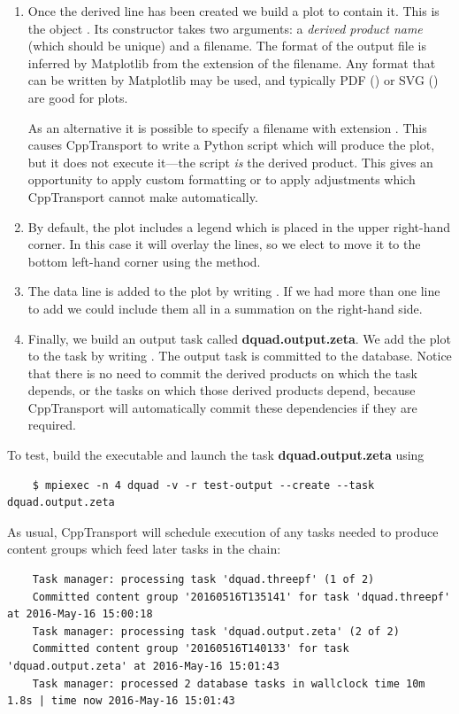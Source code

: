 \documentclass[11pt,a4paper]{article}
\renewcommand{\texttt}[1]{{\ttfamily\fontseries{l}\selectfont{#1}}}
\newcommand{\repoobject}[1]{{\ttfamily\bfseries\small #1}}
\newcommand{\packagefont}{\sffamily}
\newcommand{\CppTransport}{{\packagefont CppTransport}}
\newcommand{\Matplotlib}{{\packagefont Matplotlib}}
\newcommand{\file}[1]{\texttt{{#1}}}
\begin{document}
\begin{enumerate}
	\item Once the derived line has been created we build a plot
	to contain it. This is the object
	\texttt{time_series_plot<>}.
	Its constructor takes two arguments:
	a \emph{derived product name} (which should be unique)
	and a filename.
	The format of the output file is inferred by
	{\Matplotlib} from the extension of the filename.
	Any format that can be written by {\Matplotlib} may be used,
	and typically PDF (\file{.pdf}) or SVG (\file{.svg})
	are good for plots.
	
	As an alternative it is possible to specify a filename with extension
	\file{.py}.
	This causes {\CppTransport} to write a Python script which will produce
	the plot, but it does not execute it---the script \emph{is} the derived
	product.
	This gives an opportunity to apply custom formatting or to apply
	adjustments which {\CppTransport} cannot make automatically.
	
	\item By default, the plot includes a legend
	which is placed in the upper right-hand corner.
	In this case it will overlay the lines, so we elect to move it to the bottom
	left-hand corner using the
	\texttt{set_legend_position()} method.
	
	\item The data line \texttt{bg_fields} is added to the plot
	by writing
	\texttt{bg_plot += bg_fields}.
	If we had more than one line to add we could include them all in a summation
	on the right-hand side.
	
	\item Finally, we build an output task called
	\repoobject{dquad.output.zeta}. We add the plot to the task
	by writing
	\texttt{out_tk += bg_plot}.
	The output task is committed to the database.
	Notice that there is no need to commit the derived products on which the
	task depends,
	or the tasks on which those derived products depend,
	because {\CppTransport} will automatically commit these dependencies if they are
	required.
\end{enumerate}
To test, build the executable and launch the task
\repoobject{dquad.output.zeta} using
\begin{verbatim}
	$ mpiexec -n 4 dquad -v -r test-output --create --task dquad.output.zeta	
\end{verbatim}
As usual, {\CppTransport} will schedule execution of any tasks needed to produce
content groups which feed later tasks in the chain:
\begin{verbatim}
    Task manager: processing task 'dquad.threepf' (1 of 2)
    Committed content group '20160516T135141' for task 'dquad.threepf' at 2016-May-16 15:00:18
    Task manager: processing task 'dquad.output.zeta' (2 of 2)
    Committed content group '20160516T140133' for task 'dquad.output.zeta' at 2016-May-16 15:01:43
    Task manager: processed 2 database tasks in wallclock time 10m 1.8s | time now 2016-May-16 15:01:43
\end{verbatim}
\end{document}
